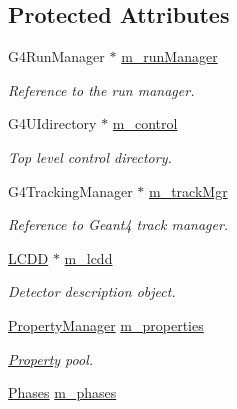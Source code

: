 \subsection*{Protected Attributes}
\begin{DoxyCompactItemize}
\item 
G4RunManager $\ast$ \hyperlink{class_d_d4hep_1_1_simulation_1_1_geant4_kernel_a3680634351832865b7df33095adf8ef7}{m\_\-runManager}
\begin{DoxyCompactList}\small\item\em Reference to the run manager. \item\end{DoxyCompactList}\item 
G4UIdirectory $\ast$ \hyperlink{class_d_d4hep_1_1_simulation_1_1_geant4_kernel_a1b097ce042c194b7fc041c3457868c2c}{m\_\-control}
\begin{DoxyCompactList}\small\item\em Top level control directory. \item\end{DoxyCompactList}\item 
G4TrackingManager $\ast$ \hyperlink{class_d_d4hep_1_1_simulation_1_1_geant4_kernel_a4bd577a1215149f49a745aa75b652565}{m\_\-trackMgr}
\begin{DoxyCompactList}\small\item\em Reference to Geant4 track manager. \item\end{DoxyCompactList}\item 
\hyperlink{class_d_d4hep_1_1_geometry_1_1_l_c_d_d}{LCDD} $\ast$ \hyperlink{class_d_d4hep_1_1_simulation_1_1_geant4_kernel_a0181177a7c4b6862a83b3a34a64a3ce9}{m\_\-lcdd}
\begin{DoxyCompactList}\small\item\em Detector description object. \item\end{DoxyCompactList}\item 
\hyperlink{class_d_d4hep_1_1_property_manager}{PropertyManager} \hyperlink{class_d_d4hep_1_1_simulation_1_1_geant4_kernel_ac69e53b910f7ce956e684c4e2ccedc9f}{m\_\-properties}
\begin{DoxyCompactList}\small\item\em \hyperlink{class_d_d4hep_1_1_property}{Property} pool. \item\end{DoxyCompactList}\item 
\hyperlink{class_d_d4hep_1_1_simulation_1_1_geant4_kernel_ae28985781d4226ece4c3fffe8827b400}{Phases} \hyperlink{class_d_d4hep_1_1_simulation_1_1_geant4_kernel_aa1357848649b7fccb42bbaa0c5f88f58}{m\_\-phases}

\end{DoxyCompactItemize}
